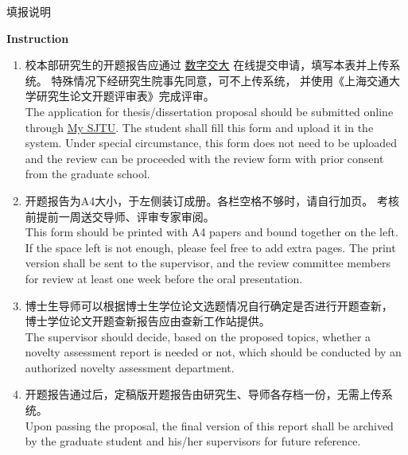 \documentclass[a4paper,zihao=-4,AutoFakeBold]{ctexart}
\begin{document}
\clearpage


\begin{center}
    \vspace*{0.5cm}
    {\heiti 填\quad 报\quad 说\quad 明}\par
    \vspace{0.66cm}
    {\bfseries Instruction}
\end{center}

\begin{enumerate}
    \fangsong
    \item 校本部研究生的开题报告应通过%
          \href{http://my.sjtu.edu.cn/}{\color{blue}\underline{数字交大}}%
          在线提交申请，填写本表并上传系统。
          特殊情况下经研究生院事先同意，可不上传系统，
          并使用《上海交通大学研究生论文开题评审表》完成评审。
          \\[0.5\baselineskip]
          The application for thesis/dissertation proposal
          should be submitted online through
          \href{http://my.sjtu.edu.cn/}{\color{blue}\underline{My SJTU}}.
          The student shall fill this form and upload it in the system.
          Under special circumstance,
          this form does not need to be uploaded
          and the review can be proceeded with the review form
          with prior consent from the graduate school.

    \item 开题报告为A4大小，于左侧装订成册。各栏空格不够时，请自行加页。
          考核前提前一周送交导师、评审专家审阅。
          \\[0.5\baselineskip]
          This form should be printed with A4 papers
          and bound together on the left.
          If the space left is not enough,
          please feel free to add extra pages.
          The print version shall be sent to the supervisor,
          and the review committee members for review
          at least one week before the oral presentation.

    \item 博士生导师可以根据博士生学位论文选题情况自行确定是否进行开题查新，
          博士学位论文开题查新报告应由查新工作站提供。
          \\[0.5\baselineskip]
          The supervisor should decide, based on the proposed topics,
          whether a novelty assessment report is needed or not,
          which should be conducted by an authorized
          novelty assessment department.

    \item 开题报告通过后，定稿版开题报告由研究生、导师各存档一份，无需上传系统。
          \\[0.5\baselineskip]
          Upon passing the proposal,
          the final version of this report shall be archived by the
          graduate student and his/her supervisors for future reference.


\end{enumerate}
\end{document}
